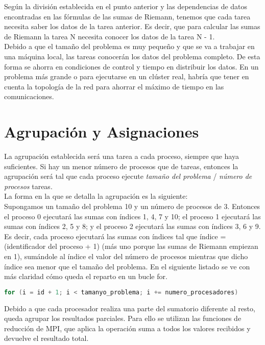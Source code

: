 \newpage \documentclass[a4paper,10pt]{article}
\begin{document}
Según la división establecida en el punto anterior y las dependencias de datos encontradas en las fórmulas de las sumas de Riemann, tenemos que cada tarea necesita saber los datos de la tarea anterior. Es decir, que para calcular las sumas de Riemann la tarea N necesita conocer los datos de la tarea N - 1.\\

Debido a que el tamaño del problema es muy pequeño y que se va a trabajar en una máquina local, las tareas conocerán los datos del problema completo. De esta forma se ahorra en condiciones de control y tiempo en distribuir los datos. En un problema más grande o para ejecutarse en un clúster real, habría que tener en cuenta la topología de la red para ahorrar el máximo de tiempo en las comunicaciones.\\

\section{Agrupación y Asignaciones}

La agrupación establecida será una tarea a cada proceso, siempre que haya suficientes. Si hay un menor número de procesos que de tareas, entonces la agrupación será tal que cada proceso ejecute \textit{tamaño del problema} / \textit{número de procesos} tareas.\\

La forma en la que se detalla la agrupación es la siguiente:\\

Supongamos un tamaño del problema 10 y un número de procesos de 3. Entonces el proceso 0 ejecutará las sumas con índices 1, 4, 7 y 10; el proceso 1 ejecutará las sumas con índices 2, 5 y 8; y el proceso 2 ejecutará las sumas con índices 3, 6 y 9. Es decir, cada proceso ejecutará las sumas con índices tal que índice = (identificador del proceso + 1) (más uno porque las sumas de Riemann empiezan en 1), sumándole al índice el valor del número de procesos mientras que dicho índice sea menor que el tamaño del problema. En el siguiente listado se ve con más claridad cómo queda el reparto en un bucle for.\\

\begin{lstlisting}[language=C]
for (i = id + 1; i < tamanyo_problema; i += numero_procesadores)
\end{lstlisting}

Debido a que cada procesador realiza una parte del sumatorio diferente al resto, queda agrupar los resultados parciales. Para ello se utilizan las funciones de reducción de MPI, que aplica la operación suma a todos los valores recibidos y devuelve el resultado total. \\
\end{document}
